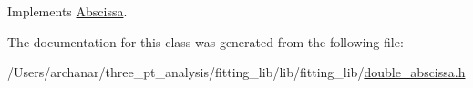 Implements \mbox{\hyperlink{classAbscissa_a98e122d32d82979bd30338abc15768fd}{Abscissa}}.



The documentation for this class was generated from the following file\+:\begin{DoxyCompactItemize}
\item 
/\+Users/archanar/three\+\_\+pt\+\_\+analysis/fitting\+\_\+lib/lib/fitting\+\_\+lib/\mbox{\hyperlink{lib_2fitting__lib_2double__abscissa_8h}{double\+\_\+abscissa.\+h}}\end{DoxyCompactItemize}
